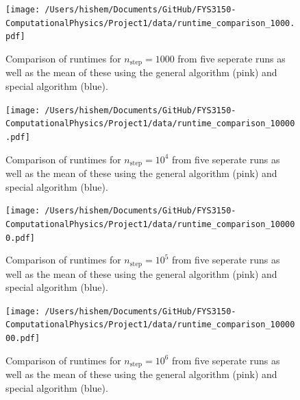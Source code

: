 \documentclass[english,notitlepage]{revtex4-1}  %
\begin{document}
\begin{figure}[h!]
    \centering 
    \texttt{[image: /Users/hishem/Documents/GitHub/FYS3150-ComputationalPhysics/Project1/data/runtime\_comparison\_1000.pdf]} %
    \caption{Comparison of runtimes for $n_\text{step} = 1000$ from five seperate runs as well as the mean of these using the general algorithm (pink) and special algorithm (blue).}
    \label{timing 3}
\end{figure}

\begin{figure}[h!]
    \centering 
    \texttt{[image: /Users/hishem/Documents/GitHub/FYS3150-ComputationalPhysics/Project1/data/runtime\_comparison\_10000.pdf]} %
    \caption{Comparison of runtimes for $n_\text{step} = 10^4$ from five seperate runs as well as the mean of these using the general algorithm (pink) and special algorithm (blue).}
    \label{timing 4}
\end{figure}

\begin{figure}[h!]
    \centering 
    \texttt{[image: /Users/hishem/Documents/GitHub/FYS3150-ComputationalPhysics/Project1/data/runtime\_comparison\_100000.pdf]} %
    \caption{Comparison of runtimes for $n_\text{step} = 10^5$ from five seperate runs as well as the mean of these using the general algorithm (pink) and special algorithm (blue).}
    \label{timing 5}
\end{figure}

\begin{figure}[h!]
    \centering 
    \texttt{[image: /Users/hishem/Documents/GitHub/FYS3150-ComputationalPhysics/Project1/data/runtime\_comparison\_1000000.pdf]} %
    \caption{Comparison of runtimes for $n_\text{step} = 10^6$ from five seperate runs as well as the mean of these using the general algorithm (pink) and special algorithm (blue).}
    \label{timing 6}
\end{figure}

   
\end{document}
